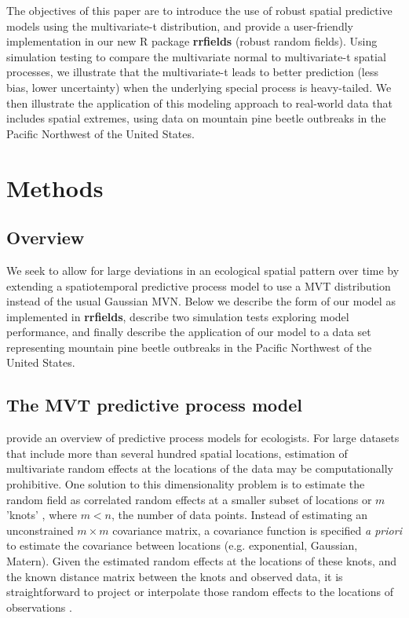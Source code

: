 \documentclass[12pt,english]{article}
\begin{document}
\begin{spacing}{1.5}
The objectives of this paper are to introduce the use of robust spatial
predictive models using the multivariate-t distribution, and provide a
user-friendly implementation in our new R package \textbf{rrfields} (robust
random fields). Using simulation testing to compare the multivariate normal to
multivariate-t spatial processes, we illustrate that the multivariate-t leads
to better prediction (less bias, lower uncertainty) when the underlying special
process is heavy-tailed. We then illustrate the application of this modeling
approach to real-world data that includes spatial extremes, using data on
mountain pine beetle outbreaks in the Pacific Northwest of the United States.

\section{Methods}

\subsection{Overview}

We seek to allow for large deviations in an ecological spatial pattern over
time by extending a spatiotemporal predictive process model to use a MVT
distribution instead of the usual Gaussian MVN. Below we describe the form of
our model as implemented in \textbf{rrfields}, describe two simulation tests
exploring model performance, and finally describe the application of our model
to a data set representing mountain pine beetle outbreaks in the Pacific
Northwest of the United States.

\subsection{The MVT predictive process model}

\citet{latimer2009} provide an overview of predictive process models for
ecologists. For large datasets that include more than several hundred spatial
locations, estimation of multivariate random effects at the locations of the
data may be computationally prohibitive. One solution to this dimensionality
problem is to estimate the random field as correlated random effects at a
smaller subset of locations or $m$ 'knots' \citep[e.g.][]{latimer2009,
  shelton2014}, where $m < n$, the number of data points. Instead of estimating
an unconstrained $m \times m$ covariance matrix, a covariance function is
specified \emph{a priori} to estimate the covariance between locations (e.g.
exponential, Gaussian, Matern). Given the estimated random effects at the
locations of these knots, and the known distance matrix between the knots and
observed data, it is straightforward to project or interpolate those random
effects to the locations of observations \citep{latimer2009, finley2009}.


\end{spacing}
\end{document}
